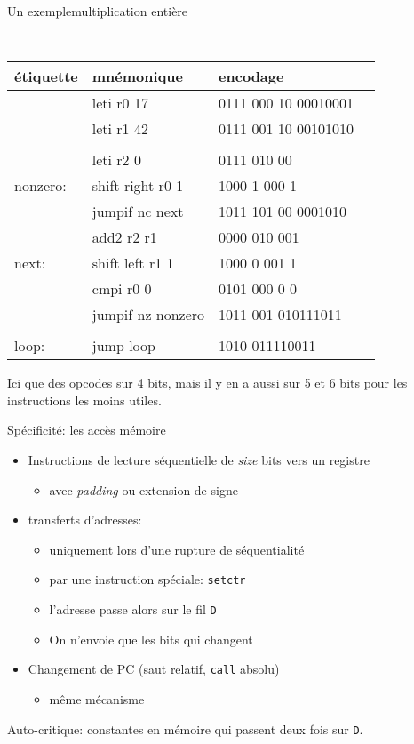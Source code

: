 \documentclass[slidetop,11pt,table]{beamer}
\begin{document}
\begin{frame}{Un exemple}{multiplication entière}
  \begin{center}
    \tt\small
    \begin{tabular}{llll}
    \textrm{étiquette} & \textrm{mnémonique} & \textrm{encodage}\\
    \hline
    
				 & leti	r0 17				 & 0111 000 10 00010001 \\
				 & leti	r1 42				 & 0111 001 10 00101010 \\
				 &									 &										 \\
				 & leti	r2 0				 & 0111 010 00				 \\
nonzero: & shift	right r0 1 & 1000 1 000 1				 \\
				 & jumpif	nc next		 & 1011 101 00 0001010	 \\
				 & add2	r2 r1				 & 0000 010 001				 \\
next:		 & shift	left r1 1	 & 1000 0 001 1				 \\
				 & cmpi	r0 0				 & 0101 000 0 0				 \\
				 & jumpif	nz nonzero & 1011 001 010111011	 \\
				 &									 &										 \\
loop:		 & jump	loop				 & 1010 011110011			 \\
  \end{tabular}
\end{center}
Ici que des opcodes sur 4 bits, mais il y en a aussi sur 5 et 6 bits pour les instructions les moins utiles.
\end{frame}


\begin{frame}{Spécificité: les accès mémoire}
  \begin{itemize}
  \item Instructions de lecture séquentielle de
    \emph{size} bits vers un registre
  \begin{itemize}
  \item avec \emph{padding} ou extension de signe
  \end{itemize}
  
\item transferts d'adresses:
  \begin{itemize}
  \item uniquement lors d'une rupture de séquentialité
  \item par une instruction spéciale: \texttt{setctr}
  \item l'adresse passe alors sur le fil \texttt{D}
  \item On n'envoie que les bits qui changent
  \end{itemize}
\item Changement de PC (saut relatif, \texttt{call} absolu)
  \begin{itemize}
  \item même mécanisme
  \end{itemize}
\end{itemize}
Auto-critique: constantes en mémoire qui passent deux fois sur \texttt{D}.
\end{frame}
\end{document}
